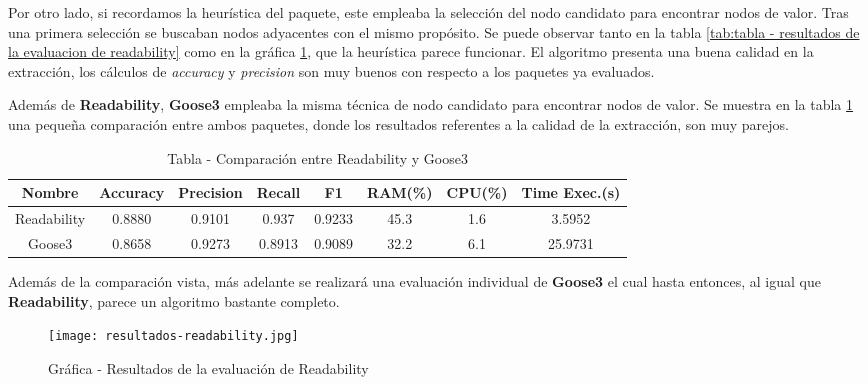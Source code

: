 Por otro lado, si recordamos la heurística del paquete, este empleaba la selección del nodo candidato para
encontrar nodos de valor. Tras una primera selección se buscaban nodos adyacentes con el mismo propósito.
Se puede observar tanto en la tabla \ref{tab:tabla - resultados de la evaluacion de readability} como en
la gráfica \ref{img:grafica - resultados de la evaluacion de readability}, que la heurística parece funcionar.
El algoritmo presenta una buena calidad en la extracción, los cálculos de \emph{accuracy} y \emph{precision}
son muy buenos con respecto a los paquetes ya evaluados.

Además de \textbf{Readability}, \textbf{Goose3} empleaba la misma técnica de nodo candidato para encontrar
nodos de valor. Se muestra en la tabla \ref{tab:tabla - comparacion entre readability y goose3} una pequeña
comparación entre ambos paquetes, donde los resultados referentes a la calidad de la extracción, son muy
parejos.

\begin{table}[h]
    \begin{center}
      \begin{tabular}{| c | c | c | c | c | c | c | c |} \hline 
       \textbf{Nombre} & \textbf{Accuracy} & \textbf{Precision}  & \textbf{Recall} & \textbf{F1} & \textbf{RAM(\%)} & \textbf{CPU(\%)} & \textbf{Time Exec.(s)} \\ \hline
       Readability & 0.8880 & 0.9101 & 0.937 & 0.9233 & 45.3 & 1.6 & 3.5952 \\ \hline
       Goose3 & 0.8658 & 0.9273 & 0.8913 & 0.9089 & 32.2 & 6.1 & 25.9731 \\ \hline
      \end{tabular}
      \caption{Tabla - Comparación entre Readability y Goose3}
      \label{tab:tabla - comparacion entre readability y goose3}
    \end{center}
\end{table}

Además de la comparación vista, más adelante se realizará una evaluación individual de \textbf{Goose3} el
cual hasta entonces, al igual que \textbf{Readability}, parece un algoritmo bastante completo.

\begin{figure}[tphb]
    \centering
    \texttt{[image: resultados-readability.jpg]}
    \caption{Gráfica - Resultados de la evaluación de Readability}
    \label{img:grafica - resultados de la evaluacion de readability}
\end{figure}

